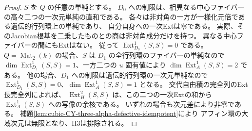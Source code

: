 \begin{proof}
$S$ を $Q$ の任意の単純とする。
$D_0$ への制限は、相異なる中心ファイバーの高々二つの一次元単純の直和である。
各々は非対角の一方が一様化元倍である遺伝的行列環上の単純であり、
自分自身への一次Extは零である。
実際、そのJacobian根基を二乗したものとの商は非対角成分だけを持つ。
異なる中心ファイバーの間にもExtはない。
従って $\operatorname{Ext}^1_{D_0}(S,S)=0$ である。
$Q=\operatorname{Mat}_2(k)$ の場合、$S$ は $D_1$ の全行列環のファイバーの単純なので
$\dim\operatorname{Ext}^1_{D_1}(S,S)=1$、一方二つの $u$ 固有値により
$\dim\operatorname{Ext}^1_A(S,S)=2$ である。
他の場合、$D_1$ への制限は遺伝的行列環の一次元単純なので
$\operatorname{Ext}^1_{D_1}(S,S)=0$、$\dim\operatorname{Ext}^1_A(S,S)=1$ となる。
交代自由積の完全列のExt長完全列によれば、
$\operatorname{Ext}^2_H(S,S)$ は、この二つの一次Extの和から
$\operatorname{Ext}^1_A(S,S)$ への写像の余核である。
いずれの場合も次元差により非零である。
補題\ref{lem:cubic-CY-three-alpha-defective-idempotent}により
アフィン環の大域次元は無限となり、H3は排除される。
\end{proof}

